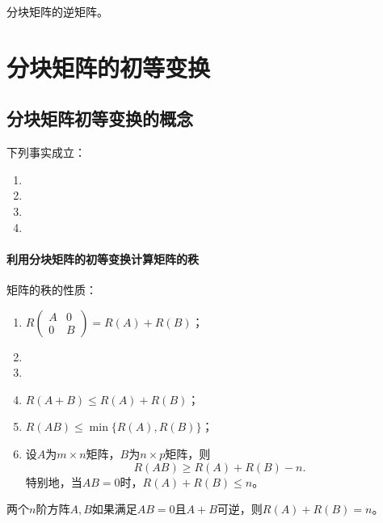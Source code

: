 分块矩阵的逆矩阵。


\section{分块矩阵的初等变换}

\subsection{分块矩阵初等变换的概念}
下列事实成立：
\begin{enumerate}
    \item %
    \item %
    \item %
    \item %
\end{enumerate}

\paragraph{利用分块矩阵的初等变换计算矩阵的秩}

矩阵的秩的性质：
\begin{enumerate}
    \item $R\begin{pmatrix}A&0\\0&B\end{pmatrix}=R(A)+R(B)$；
    \item %
    \item %
    \item $R(A+B)\le R(A)+R(B)$；
    \item $R(AB)\le \min\{R(A),R(B)\}$；
    \item 设$A$为$m\times n$矩阵，$B$为$n\times p$矩阵，则
    \[
    R(AB)\ge R(A)+R(B)-n.
    \]
    特别地，当$AB=0$时，$R(A)+R(B)\le n$。
\end{enumerate}

两个$n$阶方阵$A,B$如果满足$AB=0$且$A+B$可逆，则$R(A)+R(B)=n$。